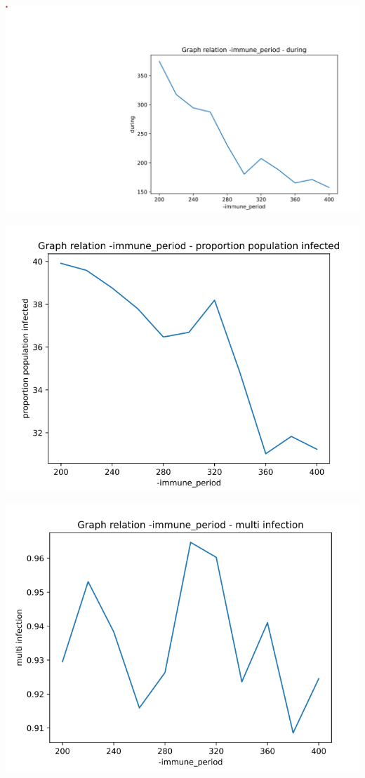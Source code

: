 \documentclass[a4paper, 11pt]{article}
\begin{document}
				
				\includegraphics[scale=0.45]{attachements/immune_period_during.png}
				
				\includegraphics[scale=0.45]{attachements/immune_period_proportion.png}
				
				\includegraphics[scale=0.45]{attachements/immune_period_multi_infection.png}
				
\end{document}
